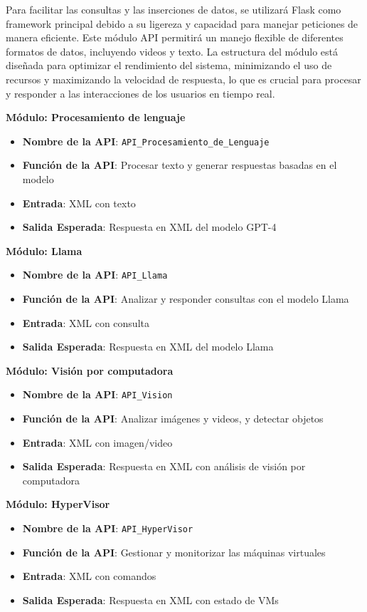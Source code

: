 Para facilitar las consultas y las inserciones de datos, se utilizará Flask como framework principal debido a su ligereza y capacidad para manejar peticiones de manera eficiente. Este módulo API permitirá un manejo flexible de diferentes formatos de datos, incluyendo videos y texto. La estructura del módulo está diseñada para optimizar el rendimiento del sistema, minimizando el uso de recursos y maximizando la velocidad de respuesta, lo que es crucial para procesar y responder a las interacciones de los usuarios en tiempo real.

\textbf{Módulo: Procesamiento de lenguaje}
\begin{itemize}
    \item \textbf{Nombre de la API}: \texttt{API\_Procesamiento\_de\_Lenguaje}
    \item \textbf{Función de la API}: Procesar texto y generar respuestas basadas en el modelo
    \item \textbf{Entrada}: XML con texto
    \item \textbf{Salida Esperada}: Respuesta en XML del modelo GPT-4
\end{itemize}

\textbf{Módulo: Llama}
\begin{itemize}
    \item \textbf{Nombre de la API}: \texttt{API\_Llama}
    \item \textbf{Función de la API}: Analizar y responder consultas con el modelo Llama
    \item \textbf{Entrada}: XML con consulta
    \item \textbf{Salida Esperada}: Respuesta en XML del modelo Llama
\end{itemize}

\textbf{Módulo: Visión por computadora}
\begin{itemize}
    \item \textbf{Nombre de la API}: \texttt{API\_Vision}
    \item \textbf{Función de la API}: Analizar imágenes y videos, y detectar objetos
    \item \textbf{Entrada}: XML con imagen/video
    \item \textbf{Salida Esperada}: Respuesta en XML con análisis de visión por computadora
\end{itemize}

\textbf{Módulo: HyperVisor}
\begin{itemize}
    \item \textbf{Nombre de la API}: \texttt{API\_HyperVisor}
    \item \textbf{Función de la API}: Gestionar y monitorizar las máquinas virtuales
    \item \textbf{Entrada}: XML con comandos
    \item \textbf{Salida Esperada}: Respuesta en XML con estado de VMs
\end{itemize}

